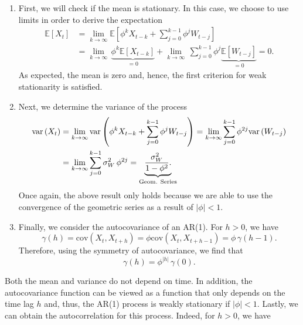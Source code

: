 \documentclass[]{book}
\providecommand{\tightlist}{%
  \setlength{\itemsep}{0pt}\setlength{\parskip}{0pt}}
\theoremstyle{definition}
\theoremstyle{definition}
\theoremstyle{definition}
\theoremstyle{remark}
\begin{document}
\begin{enumerate}
\def\labelenumi{\arabic{enumi}.}
\tightlist
\item
  First, we will check if the mean is stationary. In this case, we
  choose to use limits in order to derive the expectation
  \[\begin{aligned}
  \mathbb{E}\left[ {{X_t}} \right] &= \mathop {\lim }\limits_{k \to \infty } \mathbb{E}\left[ {{\phi^k}{X_{t-k}} + \sum\limits_{j = 0}^{k - 1} {\phi^j{W_{t - j}}} } \right] \\
  &= \mathop {\lim }\limits_{k \to \infty } \, \underbrace {{\phi ^k}{\mathbb{E}[X_{t-k}]}}_{= 0} + \mathop {\lim }\limits_{k \to \infty } \, \sum\limits_{j = 0}^{k - 1} {\phi^j\underbrace {\mathbb{E}\left[ {{W_{t - j}}} \right]}_{ = 0}}
  = 0.
  \end{aligned} \] As expected, the mean is zero and, hence, the first
  criterion for weak stationarity is satisfied.
\item
  Next, we determine the variance of the process \[\begin{aligned}
  \text{var}\left( {{X_t}} \right) &= \mathop {\lim }\limits_{k \to \infty } \text{var}\left( {{\phi^k}{X_{t-k}} + \sum\limits_{j = 0}^{k - 1} {\phi^j{W_{t - j}}} } \right)
  = \mathop {\lim }\limits_{k \to \infty } \sum\limits_{j = 0}^{k - 1} {\phi ^{2j} \text{var}\left( {{W_{t - j}}} \right)}  \\
  &= \mathop {\lim }\limits_{k \to \infty } \sum\limits_{j = 0}^{k - 1} \sigma _W^2 \, {\phi ^{2j}}  =  
    \underbrace {\frac{\sigma _W^2}{{1 - {\phi ^2}}}.}_{\begin{subarray}{l} 
      {\text{Geom. Series}} 
      \end{subarray}}
  \end{aligned} \] Once again, the above result only holds because we
  are able to use the convergence of the geometric series as a result of
  \(\left| \phi \right| < 1\).
\item
  Finally, we consider the autocovariance of an AR(1). For \(h > 0\), we
  have
  \[\gamma \left( h \right) =  \text{cov}\left( {{X_t},{X_{t + h}}} \right) = \phi \text{cov}\left( {{X_t},{X_{t + h - 1}}} \right) = \phi \, \gamma \left( h-1 \right).\]
  Therefore, using the symmetry of autocovariance, we find that
  \[\gamma \left( h \right) = \phi^{|h|} \, \gamma(0).\]
\end{enumerate}

Both the mean and variance do not depend on time. In addition, the
autocovariance function can be viewed as a function that only depends on
the time lag \(h\) and, thus, the AR(1) process is weakly stationary if
\(\left| \phi \right| < 1\). Lastly, we can obtain the autocorrelation
for this process. Indeed, for \(h > 0\), we have
\end{document}
